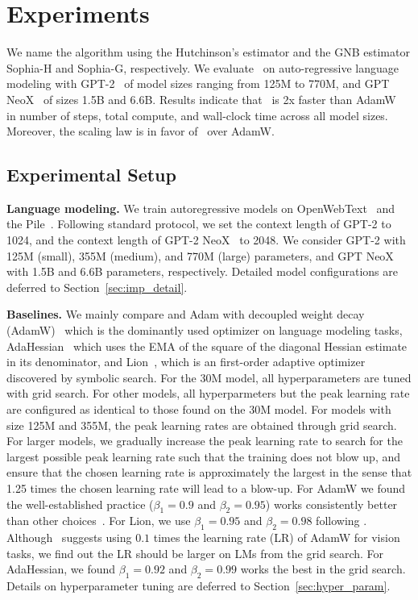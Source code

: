 \section{Experiments}\label{sec:experiments}

We name the algorithm using the Hutchinson's estimator and the GNB estimator Sophia-H and Sophia-G, respectively. We evaluate \ours~on auto-regressive language modeling with GPT-2~\citep{radford2019language} of model sizes ranging from 125M to 770M, and GPT NeoX~\citep{black2022gpt} of sizes 1.5B and 6.6B. Results indicate that \ours~is 2x faster than AdamW~\citep{loshchilov2017decoupled} in number of steps, total compute, and wall-clock time across all model sizes. Moreover, the scaling law is in favor of \ours~over AdamW. 

\subsection{Experimental Setup} \label{sec:exp_setup}


\textbf{Language modeling.} We train autoregressive models on OpenWebText~\citep{Gokaslan2019OpenWeb} and the Pile~\citep{gao2022pile}. Following standard protocol, we set the context length of GPT-2 to 1024, and the context length of GPT-2 NeoX~\citep{black2022gpt} to 2048. We consider GPT-2 with 125M (small), 355M (medium), and 770M (large) parameters, and GPT NeoX with 1.5B and 6.6B parameters, respectively. Detailed model configurations are deferred to Section~\ref{sec:imp_detail}.

\textbf{Baselines.} We mainly compare {\ours} and Adam with decoupled weight decay (AdamW)~\citep{loshchilov2017decoupled} which is the dominantly used optimizer on language modeling tasks, AdaHessian~\citep{yao2021adahessian} which uses the EMA of the square of the diagonal Hessian estimate in its denominator, and Lion~\citep{chen2023symbolic}, which is an first-order adaptive optimizer discovered by symbolic search. For the 30M model, all hyperparameters are tuned with grid search. 
For other models, all hyperparmeters but the peak learning rate are configured as identical to those found on the 30M model. For models with size 125M and 355M, the peak learning rates are obtained through grid search. 
For larger models, we gradually increase the peak learning rate to search for the largest possible peak learning rate such that the training does not blow up, and ensure that the chosen learning rate is approximately the largest in the sense that 1.25 times the chosen learning rate will lead to a blow-up. For AdamW we found the well-established practice ($\beta_1 = 0.9$ and $\beta_2 = 0.95$) works consistently better than other choices~\citep{radford2019language,mistral}. For Lion, we use $\beta_1 = 0.95$ and $\beta_2 = 0.98$ following \citet{chen2023symbolic}. Although~\citet{chen2023symbolic} suggests using $0.1$ times the learning rate (LR) of AdamW for vision tasks, we find out the LR should be larger on LMs from the grid search. For AdaHessian, we found $\beta_1 = 0.92$ and $\beta_2 = 0.99$ works the best in the grid search. Details on hyperparameter tuning are deferred to Section~\ref{sec:hyper_param}.


